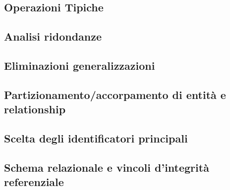 \subsection{Operazioni Tipiche}


\subsection{Analisi ridondanze}
	
	
\subsection{Eliminazioni generalizzazioni}


\subsection{Partizionamento/accorpamento di entità e relationship}


\subsection{Scelta degli identificatori principali}


\subsection{Schema relazionale e vincoli d'integrità referenziale}
